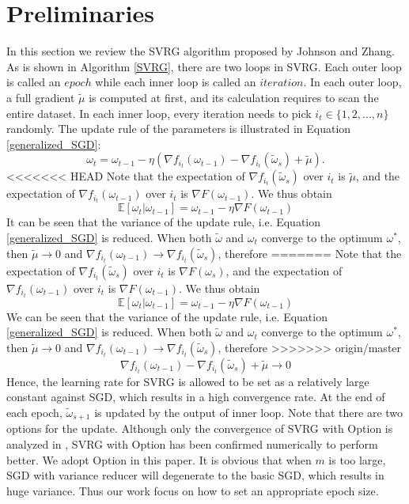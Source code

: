 \documentclass[conference]{IEEEtran}
\begin{document}
\section{Preliminaries}
\label{svrg_review}
 In this section we review the SVRG algorithm proposed by Johnson and Zhang\citep{Johnson:9MAvkbgy}.  As is shown in Algorithm \ref{SVRG}, there are two loops in SVRG. Each outer loop is called an $epoch$ while each inner loop is called an $iteration$. In each outer loop, a full gradient $\tilde{\mu}$ is computed at first, and its calculation requires to scan the entire dataset. In each inner loop,  every iteration needs to pick $i_t\in\{1, 2, ..., n\}$ randomly. The update rule of the parameters is illustrated in Equation \ref{generalized_SGD}:
\begin{equation}
\label{generalized_SGD}
\omega_t = \omega_{t-1} - \eta(\nabla f_{i_t}(\omega_{t-1}) - \nabla f_{i_t}(\tilde{\omega}_s)+\tilde{\mu}).
\end{equation}
<<<<<<< HEAD
Note that the expectation of $\nabla f_{i_t}(\tilde{\omega}_s)$ over $i_t$ is $\tilde{\mu}$, and the expectation of $\nabla f_{i_t}(\omega_{t-1})$ over $i_t$ is $\nabla F(\omega_{t-1})$. We thus obtain
\begin{equation}
\mathbb{E}[\omega_{t} | \omega_{t-1}] = \omega_{t-1} - \eta\nabla F(\omega_{t-1})
\end{equation}
 It can be seen that the variance of the update rule, i.e. Equation \ref{generalized_SGD} is reduced. When both $\tilde{\omega}$ and $\omega_t$ converge to the optimum $\omega^*$, then $\tilde{\mu}\rightarrow0$ and $\nabla f_{i_t}(\omega_{t-1})\rightarrow\nabla f_{i_t}(\tilde{\omega}_s)$, therefore
=======
Note that the expectation of $\nabla f_{i_t}(\tilde{\omega}_s)$ over $i_t$ is $\nabla F(\omega_{s})$, and the expectation of $\nabla f_{i_t}(\omega_{t-1})$ over $i_t$ is $\nabla F(\omega_{t-1})$. We thus obtain
\begin{equation}
\mathbb{E}[\omega_{t} | \omega_{t-1}] = \omega_{t-1} - \eta\nabla F(\omega_{t-1})
\end{equation}
 We can be seen that the variance of the update rule, i.e. Equation \ref{generalized_SGD} is reduced. When both $\tilde{\omega}$ and $\omega_t$ converge to the optimum $\omega^*$, then $\tilde{\mu}\rightarrow0$ and $\nabla f_{i_t}(\omega_{t-1})\rightarrow\nabla f_{i_t}(\tilde{\omega}_s)$, therefore
>>>>>>> origin/master
 $$\nabla f_{i_t}(\omega_{t-1}) - \nabla f_{i_t}(\tilde{\omega}_s)+\tilde{\mu}\rightarrow0$$
 Hence, the learning rate for SVRG is allowed to be set as a relatively large constant against SGD, which results in a high convergence rate.
At the end of each epoch, $\tilde\omega_{s+1}$ is updated by the output of inner loop. Note that there are two options for the update. Although only the convergence of SVRG with Option \uppercase\expandafter{} is analyzed in \citep{Johnson:9MAvkbgy}, SVRG with Option \uppercase\expandafter{} has been confirmed numerically to perform better. We adopt Option \uppercase\expandafter{} in this paper. It is obvious that when $m$ is too large, SGD with variance reducer will degenerate to the basic SGD, which results in huge variance. Thus our work focus on how to set an appropriate epoch size.
 
\end{document}
